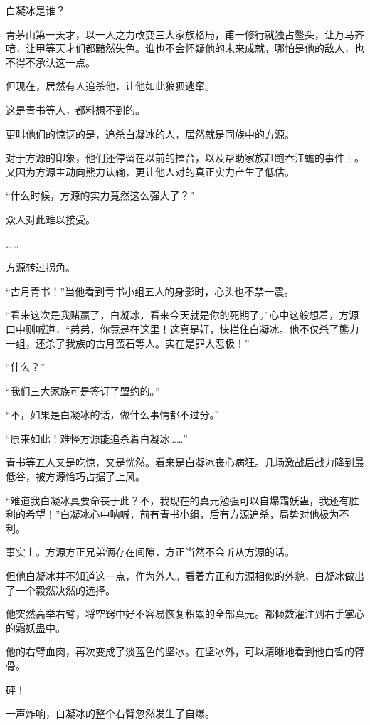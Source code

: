
\begin{this_body}

白凝冰是谁？

青茅山第一天才，以一人之力改变三大家族格局，甫一修行就独占鳌头，让万马齐喑，让甲等天才们都黯然失色。谁也不会怀疑他的未来成就，哪怕是他的敌人，也不得不承认这一点。

但现在，居然有人追杀他，让他如此狼狈逃窜。

这是青书等人，都料想不到的。

更叫他们的惊讶的是，追杀白凝冰的人，居然就是同族中的方源。

对于方源的印象，他们还停留在以前的擂台，以及帮助家族赶跑吞江蟾的事件上。又因为方源主动向熊力认输，更让他人对的真正实力产生了低估。

“什么时候，方源的实力竟然这么强大了？”

众人对此难以接受。

……

方源转过拐角。

“古月青书！”当他看到青书小组五人的身影时，心头也不禁一震。

“看来这次是我赌赢了，白凝冰，看来今天就是你的死期了。”心中这般想着，方源口中则喊道，“弟弟，你竟是在这里！这真是好，快拦住白凝冰。他不仅杀了熊力一组，还杀了我族的古月蛮石等人。实在是罪大恶极！”

“什么？”

“我们三大家族可是签订了盟约的。”

“不，如果是白凝冰的话，做什么事情都不过分。”

“原来如此！难怪方源能追杀着白凝冰……”

青书等五人又是吃惊，又是恍然。看来是白凝冰丧心病狂。几场激战后战力降到最低谷，被方源恰巧占据了上风。

“难道我白凝冰真要命丧于此？不，我现在的真元勉强可以自爆霜妖蛊，我还有胜利的希望！”白凝冰心中呐喊，前有青书小组，后有方源追杀，局势对他极为不利。

事实上。方源方正兄弟俩存在间隙，方正当然不会听从方源的话。

但他白凝冰并不知道这一点，作为外人。看着方正和方源相似的外貌，白凝冰做出了一个毅然决然的选择。

他突然高举右臂，将空窍中好不容易恢复积累的全部真元。都倾数灌注到右手掌心的霜妖蛊中。

他的右臂血肉，再次变成了淡蓝色的坚冰。在坚冰外，可以清晰地看到他白皙的臂骨。

砰！

一声炸响，白凝冰的整个右臂忽然发生了自爆。


\end{this_body}

